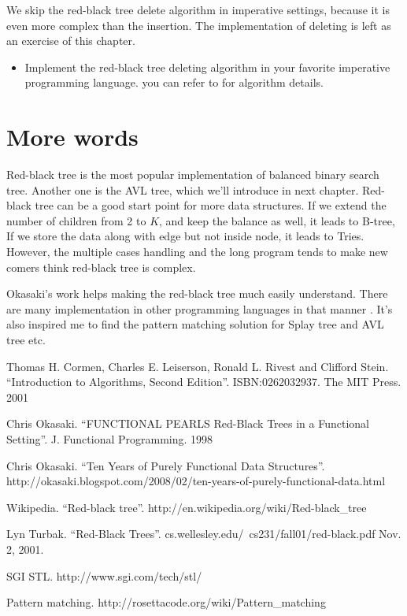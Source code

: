 \documentclass{article}
\begin{document}
We skip the red-black tree delete algorithm in imperative settings, because it
is even more complex than the insertion. The implementation of deleting is
left as an exercise of this chapter.

\begin{Exercise}

\begin{itemize}
\item Implement the red-black tree deleting algorithm in your favorite
imperative programming language. you can refer to \cite{CLRS} for algorithm
details.
\end{itemize}

\end{Exercise}

\section{More words}
Red-black tree is the most popular implementation of balanced binary search
tree. Another one is the AVL tree, which we'll introduce in next chapter.
Red-black tree can be a good start point for more data structures. If we
extend the number of children from 2 to $K$, and keep the balance as well,
it leads to B-tree, If we store the data along with edge but not inside
node, it leads to Tries. However, the multiple cases handling and the long
program tends to make new comers think red-black tree is complex.

Okasaki's work helps making the red-black tree much easily understand.
There are many implementation in other programming languages in that
manner \cite{rosetta}. It's also inspired me to find the pattern matching
solution for Splay tree and AVL tree etc.

\begin{thebibliography}{99}

Thomas H. Cormen, Charles E. Leiserson, Ronald L. Rivest and Clifford Stein.
``Introduction to Algorithms, Second Edition''. ISBN:0262032937. The MIT Press. 2001

Chris Okasaki. ``FUNCTIONAL PEARLS Red-Black Trees in a Functional Setting''. J. Functional Programming. 1998

Chris Okasaki. ``Ten Years of Purely Functional Data Structures''. http://okasaki.blogspot.com/2008/02/ten-years-of-purely-functional-data.html

Wikipedia. ``Red-black tree''. http://en.wikipedia.org/wiki/Red-black\_tree

Lyn Turbak. ``Red-Black Trees''. cs.wellesley.edu/~cs231/fall01/red-black.pdf Nov. 2, 2001.

SGI STL. http://www.sgi.com/tech/stl/

Pattern matching. http://rosettacode.org/wiki/Pattern\_matching

\end{thebibliography}

\ifx\wholebook\relax\else
\end{document}
